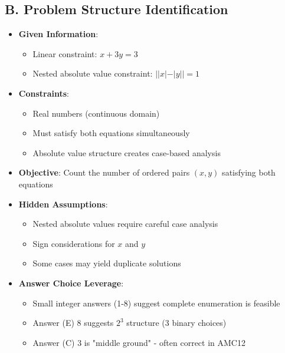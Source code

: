 \documentclass[]{article}
\begin{document}
\begin{problemconfigbox}
\subsection*{B. Problem Structure Identification}
\begin{itemize}[leftmargin=*]
    \item \textbf{Given Information}: 
    \begin{itemize}
        \item Linear constraint: $x + 3y = 3$
        \item Nested absolute value constraint: $||x| - |y|| = 1$
    \end{itemize}
    \item \textbf{Constraints}: 
    \begin{itemize}
        \item Real numbers (continuous domain)
        \item Must satisfy both equations simultaneously
        \item Absolute value structure creates case-based analysis
    \end{itemize}
    \item \textbf{Objective}: Count the number of ordered pairs $(x,y)$ satisfying both equations
    \item \textbf{Hidden Assumptions}: 
    \begin{itemize}
        \item Nested absolute values require careful case analysis
        \item Sign considerations for $x$ and $y$
        \item Some cases may yield duplicate solutions
    \end{itemize}
    \item \textbf{Answer Choice Leverage}: 
    \begin{itemize}
        \item Small integer answers (1-8) suggest complete enumeration is feasible
        \item Answer (E) 8 suggests $2^3$ structure (3 binary choices)
        \item Answer (C) 3 is "middle ground" - often correct in AMC12
    \end{itemize}
\end{itemize}


\end{problemconfigbox}
\end{document}

